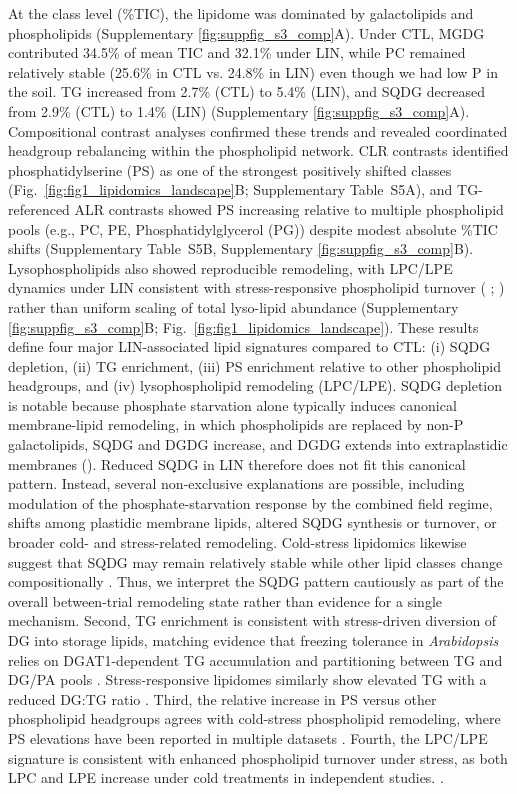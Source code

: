 \documentclass[9pt,twocolumn,twoside]{rilabRxiv}
\begin{document}
At the class level (\%TIC), the lipidome was dominated by galactolipids and phospholipids (Supplementary \ref{fig:suppfig_s3_comp}A). Under CTL, MGDG contributed 34.5\% of mean TIC and 32.1\% under LIN, while PC remained relatively stable (25.6\% in CTL vs. 24.8\% in LIN) even though we had low P in the soil. TG increased from 2.7\% (CTL) to 5.4\% (LIN), and SQDG decreased from 2.9\% (CTL) to 1.4\% (LIN) (Supplementary \ref{fig:suppfig_s3_comp}A). Compositional contrast analyses confirmed these trends and revealed coordinated headgroup rebalancing within the phospholipid network. CLR contrasts identified phosphatidylserine (PS) as one of the strongest positively shifted classes (Fig.~\ref{fig:fig1_lipidomics_landscape}B; Supplementary Table~S5A), and TG-referenced ALR contrasts showed PS increasing relative to multiple phospholipid pools (e.g., PC, PE, Phosphatidylglycerol (PG)) despite modest absolute \%TIC shifts (Supplementary Table~S5B, Supplementary \ref{fig:suppfig_s3_comp}B). Lysophospholipids also showed reproducible remodeling, with LPC/LPE dynamics under LIN consistent with stress-responsive phospholipid turnover ( \cite{Hou2016}; \cite{Rawat2021}) rather than uniform scaling of total lyso-lipid abundance (Supplementary \ref{fig:suppfig_s3_comp}B; Fig.~\ref{fig:fig1_lipidomics_landscape}). These results define four major LIN-associated lipid signatures compared to CTL: (i) SQDG depletion, (ii) TG enrichment, (iii) PS enrichment relative to other phospholipid headgroups, and (iv) lysophospholipid remodeling (LPC/LPE). SQDG depletion is notable because phosphate starvation alone typically induces canonical membrane-lipid remodeling, in which phospholipids are replaced by non-P galactolipids, SQDG and DGDG increase, and DGDG extends into extraplastidic membranes (\cite{Essigmann1998,Hartel2000,Jouhet2004,KellyDormann2002,Pfaff2020}). Reduced SQDG in LIN therefore does not fit this canonical pattern. Instead, several non-exclusive explanations are possible, including modulation of the phosphate-starvation response by the combined field regime, shifts among plastidic membrane lipids, altered SQDG synthesis or turnover, or broader cold- and stress-related remodeling. Cold-stress lipidomics likewise suggest that SQDG may remain relatively stable while other lipid classes change compositionally \citep{Yan2025}. Thus, we interpret the SQDG pattern cautiously as part of the overall between-trial remodeling state rather than evidence for a single mechanism. Second, TG enrichment is consistent with stress-driven diversion of DG into storage lipids, matching evidence that freezing tolerance in \emph{Arabidopsis} relies on DGAT1-dependent TG accumulation and partitioning between TG and DG/PA pools \citep{Tan2018}. Stress-responsive lipidomes similarly show elevated TG with a reduced DG:TG ratio \citep{Yan2025,Pfaff2020}. Third, the relative increase in PS versus other phospholipid headgroups agrees with cold-stress phospholipid remodeling, where PS elevations have been reported in multiple datasets \citep{Yan2025,Zhang2020}. Fourth, the LPC/LPE signature is consistent with enhanced phospholipid turnover under stress, as both LPC and LPE increase under cold treatments in independent studies. \citep{Yan2025,Zhang2020}.
\end{document}
